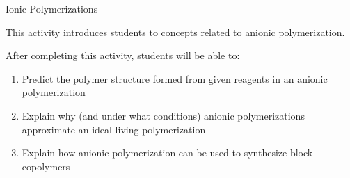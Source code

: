 %
%
%
%

\renewcommand{\figpath}{content/polymchem/livingpolyms/ionic-polyms/figs}
\renewcommand{\labelbase}{ionic-polyms}

\begin{activity}{Ionic Polymerizations}

\begin{instructornotes}
	This activity introduces students to concepts related to anionic polymerization.
	
	After completing this activity, students will be able to:
	\begin{enumerate}
		\item Predict the polymer structure formed from given reagents in an anionic polymerization
		\item Explain why (and under what conditions) anionic polymerizations approximate an ideal living polymerization
		\item Explain how anionic polymerization can be used to synthesize block copolymers
	\end{enumerate}
	

\end{instructornotes}
\end{activity}
